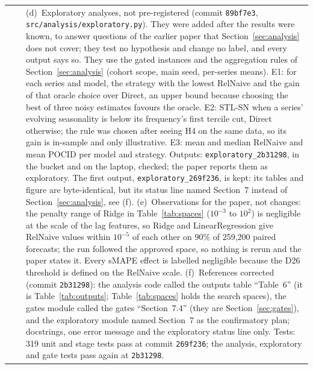 \documentclass[11pt,a4paper]{article}
\newcommand{\code}[1]{\texttt{#1}}
\begin{document}
\begin{longtable}{@{}p{1.3cm} p{1.9cm} p{11.8cm}@{}}
 & & (d)~Exploratory analyses, not pre-registered (commit \code{89bf7e3}, \mbox{\code{src/analysis/exploratory.py}}). They were added after the results were known, to answer questions of the earlier paper that Section~\ref{sec:analysis} does not cover; they test no hypothesis and change no label, and every output says so. They use the gated instances and the aggregation rules of Section~\ref{sec:analysis} (cohort scope, main seed, per-series means). E1: for each series and model, the strategy with the lowest RelNaive and the gain of that oracle choice over Direct, an upper bound because choosing the best of three noisy estimates favours the oracle. E2: STL-SN when a series' evolving seasonality is below its frequency's first tercile cut, Direct otherwise; the rule was chosen after seeing H4 on the same data, so its gain is in-sample and only illustrative. E3: mean and median RelNaive and mean POCID per model and strategy. Outputs: \mbox{\code{exploratory_2b31298}}, in the bucket and on the laptop, checked; the paper reports them as exploratory. The first output, \mbox{\code{exploratory_269f236}}, is kept: its tables and figure are byte-identical, but its status line named Section~7 instead of Section~\ref{sec:analysis}, see (f). (e)~Observations for the paper, not changes: the penalty range of Ridge in Table~\ref{tab:spaces} ($10^{-3}$ to $10^{2}$) is negligible at the scale of the lag features, so Ridge and LinearRegression give RelNaive values within $10^{-5}$ of each other on 90\% of 259,200 paired forecasts; the run followed the approved space, so nothing is rerun and the paper states it. Every sMAPE effect is labelled negligible because the D26 threshold is defined on the RelNaive scale. (f)~References corrected (commit \code{2b31298}): the analysis code called the outputs table ``Table~6'' (it is Table~\ref{tab:outputs}; Table~\ref{tab:spaces} holds the search spaces), the gates module called the gates ``Section~7.4'' (they are Section~\ref{sec:gates}), and the exploratory module named Section~7 as the confirmatory plan; docstrings, one error message and the exploratory status line only. Tests: 319 unit and stage tests pass at commit \code{269f236}; the analysis, exploratory and gate tests pass again at \code{2b31298}. \\

\end{longtable}
\end{document}
